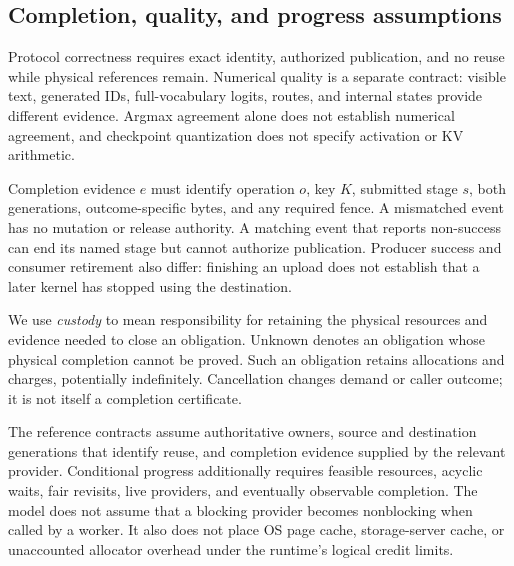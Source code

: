 \subsection{Completion, quality, and progress assumptions}
Protocol correctness requires exact identity, authorized publication, and
no reuse while physical references remain. Numerical quality is a separate
contract: visible text, generated IDs, full-vocabulary logits, routes, and
internal states provide different evidence. Argmax agreement alone does not
establish numerical agreement, and checkpoint quantization does not specify
activation or KV arithmetic.

Completion evidence $e$ must identify operation $o$, key $K$, submitted stage
$s$, both generations, outcome-specific bytes, and any required fence. A
mismatched event has no mutation or release authority. A matching event that
reports non-success can end its named stage but cannot authorize publication.
Producer success and consumer retirement also differ: finishing an upload
does not establish that a later kernel has stopped using the destination.

We use \emph{custody} to mean responsibility for retaining the physical
resources and evidence needed to close an obligation. \textsf{Unknown}
denotes an obligation whose physical completion cannot be proved. Such an
obligation retains allocations and charges, potentially indefinitely.
Cancellation changes demand or caller outcome; it is not itself a completion
certificate.

The reference contracts assume authoritative owners, source and destination
generations that identify reuse, and completion evidence supplied by the
relevant provider. Conditional progress additionally requires feasible
resources, acyclic waits, fair revisits, live providers, and eventually
observable completion. The model does not assume that a blocking provider
becomes nonblocking when called by a worker. It also does not place OS page
cache, storage-server cache, or unaccounted allocator overhead under the
runtime's logical credit limits.
